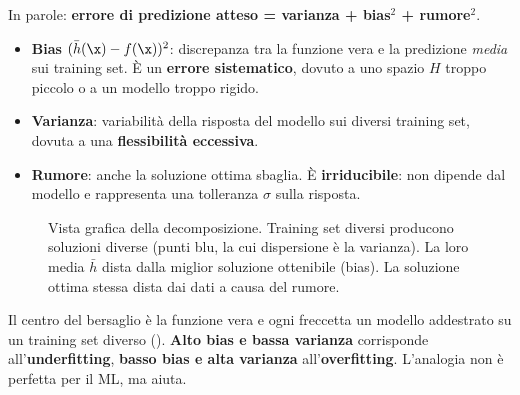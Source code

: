 In parole: \textbf{errore di predizione atteso = varianza + bias$^2$ + rumore$^2$}.
\begin{itemize}
  \item \textbf{Bias} $(\bar h(\x)-f(\x))^2$: discrepanza tra la funzione vera e la predizione \emph{media}
        sui training set. È un \textbf{errore sistematico}, dovuto a uno spazio $H$ troppo piccolo o a un modello
        troppo rigido.
  \item \textbf{Varianza}: variabilità della risposta del modello sui diversi training set, dovuta a una
        \textbf{flessibilità eccessiva}.
  \item \textbf{Rumore}: anche la soluzione ottima sbaglia. È \textbf{irriducibile}: non dipende dal modello e
        rappresenta una tolleranza $\sigma$ sulla risposta.
\end{itemize}

\begin{figure}[ht]
\centering
{}
\caption{Vista grafica della decomposizione. Training set diversi producono soluzioni diverse (punti blu, la cui
dispersione è la varianza). La loro media $\bar h$ dista dalla miglior soluzione ottenibile (bias). La soluzione
ottima stessa dista dai dati a causa del rumore.}
\label{fig:bv-grafica}
\end{figure}

\begin{esempio}
Il centro del bersaglio è la funzione vera e ogni freccetta un modello addestrato su un training set diverso
(). \textbf{Alto bias e bassa varianza} corrisponde all'\textbf{underfitting},
\textbf{basso bias e alta varianza} all'\textbf{overfitting}. L'analogia non è perfetta per il ML, ma aiuta.
\end{esempio}


